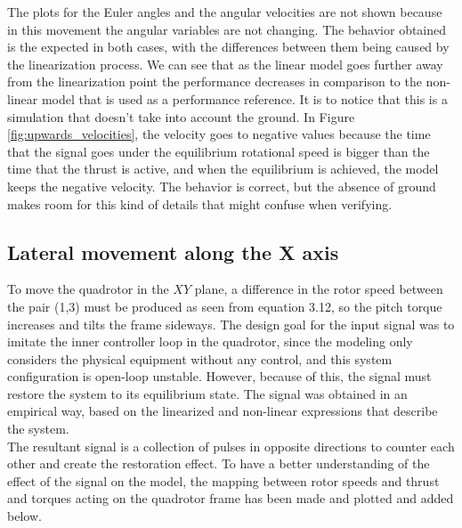 The plots for the Euler angles and the angular velocities are not shown because in this movement the angular variables are not changing. The behavior obtained is the expected in both cases, with the differences between them being caused by the linearization process. We can see that as the linear model goes further away from the linearization point the performance decreases in comparison to the non-linear model that is used as a performance reference. It is to notice that this is a simulation that doesn't take into account the ground. In Figure \ref{fig:upwards_velocities}, the velocity goes to negative values because the time that the signal goes under the equilibrium rotational speed is bigger than the time that the thrust is active, and when the equilibrium is achieved, the model keeps the negative velocity. The behavior is correct, but the absence of ground makes room for this kind of details that might confuse when verifying. \newpage

\subsection{Lateral movement along the X axis}
To move the quadrotor in the $XY$ plane, a difference in the rotor speed between the pair (1,3) must be produced as seen from equation 3.12, so the pitch torque increases and tilts the frame sideways. The design goal for the input signal was to imitate the inner controller loop in the quadrotor, since the modeling only considers the physical equipment without any control, and this system configuration is open-loop unstable. However, because of this, the signal must restore the system to its equilibrium state. The signal was obtained in an empirical way, based on the linearized and non-linear expressions that describe the system. \\

The resultant signal is a collection of pulses in opposite directions to counter each other and create the restoration effect. To have a better understanding of the effect of the signal on the model, the mapping between rotor speeds and thrust and torques acting on the quadrotor frame has been made and plotted and added below.

